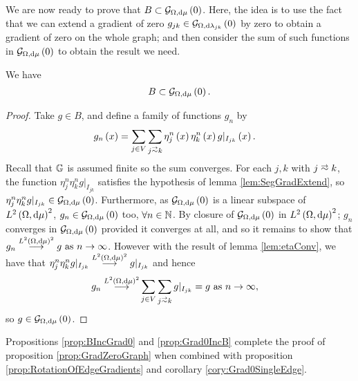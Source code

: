 We are now ready to prove that $B\subset\mathcal{G}_{ \Omega, \mathrm{d}\mu}\left( 0 \right)$.
Here, the idea is to use the fact that we can extend a gradient of zero $g_{jk}\in\mathcal{G}_{ \Omega, \mathrm{d}\lambda_{jk}}\left( 0 \right)$ by zero to obtain a gradient of zero on the whole graph; and then consider the sum of such functions in $\mathcal{G}_{ \Omega, \mathrm{d}\mu}\left( 0 \right)$ to obtain the result we need.
\begin{prop} \label{prop:BIncGrad0}
	We have
	\begin{align*}
		B \subset \mathcal{G}_{ \Omega, \mathrm{d}\mu}\left( 0 \right).
	\end{align*}
\end{prop}
\begin{proof}
	Take $g\in B$, and define a family of functions $g_n$ by
	\begin{align*}
		g_n\bracs{x} &= \sum_{j\in V}\sum_{j\conLeft k}\eta_j^n\bracs{x}\eta_k^n\bracs{x}g\vert_{I_{jk}}\bracs{x}.
	\end{align*}
	Recall that $\mathbb{G}$ is assumed finite so the sum converges.
	For each $j,k$ with $j\conLeft k$, the function $\eta_j^n\eta_k^n g\vert_{I_{jk}}$ satisfies the hypothesis of lemma \ref{lem:SegGradExtend}, so $\eta_j^n\eta_k^n g\vert_{I_{jk}}\in\mathcal{G}_{ \Omega, \mathrm{d}\mu}\left( 0 \right)$.
	Furthermore, as $\mathcal{G}_{ \Omega, \mathrm{d}\mu}\left( 0 \right)$ is a linear subspace of $L^{2}\left( \Omega,\mathrm{d}\mu \right)^{2}$, $g_n\in\mathcal{G}_{ \Omega, \mathrm{d}\mu}\left( 0 \right)$ too, $\forall n\in\mathbb{N}$.
	By closure of $\mathcal{G}_{ \Omega, \mathrm{d}\mu}\left( 0 \right)$ in $L^{2}\left( \Omega,\mathrm{d}\mu \right)^2$; $g_n$ converges in $\mathcal{G}_{ \Omega, \mathrm{d}\mu}\left( 0 \right)$ provided it converges at all, and so it remains to show that $g_n\overset{L^{2}\left( \Omega,\mathrm{d}\mu \right)^2}{\longrightarrow} g \ \text{as} \ n \rightarrow\infty$.
	However with the result of lemma \ref{lem:etaConv}, we have that $\eta_j^n\eta_k^n g\vert_{I_{jk}}\overset{L^{2}\left( \Omega,\mathrm{d}\mu \right)^2}{\longrightarrow} g\vert_{I_{jk}}$ and hence
	\begin{align*}
		g_n \lconv{\ltwo{\ddom}{\ddmes}^2} &\sum_{j\in V}\sum_{j\conLeft k}g\vert_{I_{jk}} = g \toInfty{n},
	\end{align*}
	so $g\in\mathcal{G}_{ \Omega, \mathrm{d}\mu}\left( 0 \right)$.
\end{proof}
Propositions \ref{prop:BIncGrad0} and \ref{prop:Grad0IncB} complete the proof of proposition \ref{prop:GradZeroGraph} when combined with proposition \ref{prop:RotationOfEdgeGradients} and corollary \ref{cory:Grad0SingleEdge}.

